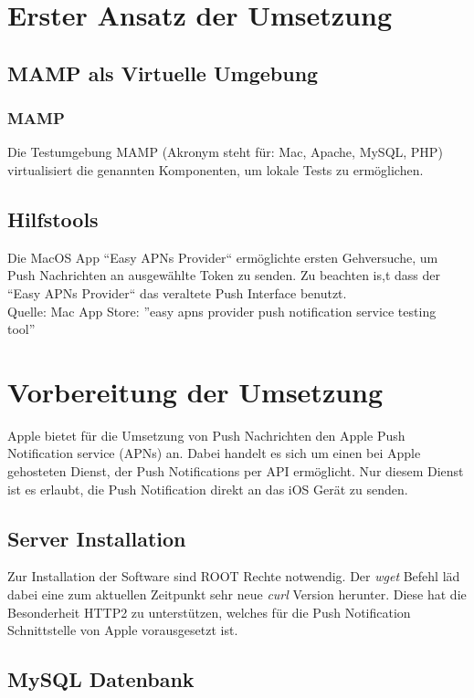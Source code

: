 \newpage


\section{Erster Ansatz der Umsetzung}

\subsection{MAMP als Virtuelle Umgebung}

\subsubsection{MAMP}
Die Testumgebung MAMP (Akronym steht für: Mac, Apache, MySQL, PHP) virtualisiert die genannten Komponenten, um lokale Tests zu ermöglichen.

\subsection{Hilfstools}
Die MacOS App ``Easy APNs Provider`` ermöglichte ersten Gehversuche, um Push Nachrichten an ausgewählte Token zu senden.
Zu beachten is,t dass der ``Easy APNs Provider`` das veraltete Push Interface benutzt. 
\\
Quelle: Mac App Store: ''easy apns provider push
 notification service testing tool''

\section{Vorbereitung der Umsetzung}
Apple bietet für die Umsetzung von Push Nachrichten den Apple Push Notification service (APNs) an. Dabei handelt es sich um einen bei Apple gehosteten Dienst, der Push Notifications per API ermöglicht. Nur diesem Dienst ist es erlaubt, die Push Notification direkt an das iOS Gerät zu senden.


\subsection{Server Installation}
Zur Installation der Software sind ROOT Rechte notwendig. Der \textit{wget} Befehl läd dabei eine zum aktuellen Zeitpunkt sehr neue \textit{curl} Version herunter. Diese hat die Besonderheit HTTP2 zu unterstützen, welches für die Push Notification Schnittstelle von Apple vorausgesetzt ist.

\newpage

\subsection{MySQL Datenbank}

